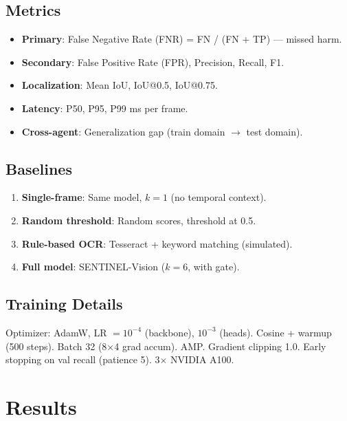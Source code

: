 \documentclass[11pt,a4paper]{article}
\begin{document}
\subsection{Metrics}
\begin{itemize}
    \item \textbf{Primary}: False Negative Rate (FNR) = FN / (FN + TP) --- missed harm.
    \item \textbf{Secondary}: False Positive Rate (FPR), Precision, Recall, F1.
    \item \textbf{Localization}: Mean IoU, IoU@0.5, IoU@0.75.
    \item \textbf{Latency}: P50, P95, P99 ms per frame.
    \item \textbf{Cross-agent}: Generalization gap (train domain $\to$ test domain).
\end{itemize}

\subsection{Baselines}
\begin{enumerate}
    \item \textbf{Single-frame}: Same model, $k=1$ (no temporal context).
    \item \textbf{Random threshold}: Random scores, threshold at 0.5.
    \item \textbf{Rule-based OCR}: Tesseract + keyword matching (simulated).
    \item \textbf{Full model}: SENTINEL-Vision ($k=6$, with gate).
\end{enumerate}

\subsection{Training Details}
Optimizer: AdamW, LR $= 10^{-4}$ (backbone), $10^{-3}$ (heads). Cosine + warmup (500 steps). Batch 32 (8$\times$4 grad accum). AMP. Gradient clipping 1.0. Early stopping on val recall (patience 5). 3$\times$ NVIDIA A100.

\section{Results}
\end{document}

